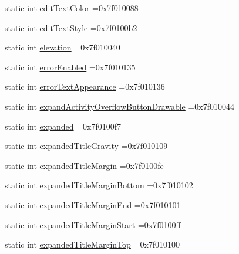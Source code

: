 \begin{DoxyCompactItemize}
\item 
static int \hyperlink{classandroid_1_1support_1_1v7_1_1appcompat_1_1R_1_1attr_ae11656aa9c64037231331f234774b280}{edit\+Text\+Color} =0x7f010088
\item 
static int \hyperlink{classandroid_1_1support_1_1v7_1_1appcompat_1_1R_1_1attr_a74d4dc05fa3ea797344808fee27b9ee2}{edit\+Text\+Style} =0x7f0100b2
\item 
static int \hyperlink{classandroid_1_1support_1_1v7_1_1appcompat_1_1R_1_1attr_a4ad8a7d23ae4731f5836683e9cb7f790}{elevation} =0x7f010040
\item 
static int \hyperlink{classandroid_1_1support_1_1v7_1_1appcompat_1_1R_1_1attr_a6b82c15fbb66c136709becccec25f526}{error\+Enabled} =0x7f010135
\item 
static int \hyperlink{classandroid_1_1support_1_1v7_1_1appcompat_1_1R_1_1attr_a3eeafb095dc2fd2d478b56b33313af0b}{error\+Text\+Appearance} =0x7f010136
\item 
static int \hyperlink{classandroid_1_1support_1_1v7_1_1appcompat_1_1R_1_1attr_a804ae4660db47a214095c80b7b7a5735}{expand\+Activity\+Overflow\+Button\+Drawable} =0x7f010044
\item 
static int \hyperlink{classandroid_1_1support_1_1v7_1_1appcompat_1_1R_1_1attr_a7837ae33f7b43370d81f841bd1cb2f95}{expanded} =0x7f0100f7
\item 
static int \hyperlink{classandroid_1_1support_1_1v7_1_1appcompat_1_1R_1_1attr_a08627166561727866e3653cd31edcaed}{expanded\+Title\+Gravity} =0x7f010109
\item 
static int \hyperlink{classandroid_1_1support_1_1v7_1_1appcompat_1_1R_1_1attr_a7b201fb107f130eb06fe70e6910942ca}{expanded\+Title\+Margin} =0x7f0100fe
\item 
static int \hyperlink{classandroid_1_1support_1_1v7_1_1appcompat_1_1R_1_1attr_a27c921b6ba56656c0f68d92fd8d73095}{expanded\+Title\+Margin\+Bottom} =0x7f010102
\item 
static int \hyperlink{classandroid_1_1support_1_1v7_1_1appcompat_1_1R_1_1attr_a50689e9cb989e5597e509e70eb5f04e4}{expanded\+Title\+Margin\+End} =0x7f010101
\item 
static int \hyperlink{classandroid_1_1support_1_1v7_1_1appcompat_1_1R_1_1attr_a2d39a2245400f68ecb7cd82e84823f57}{expanded\+Title\+Margin\+Start} =0x7f0100ff
\item 
static int \hyperlink{classandroid_1_1support_1_1v7_1_1appcompat_1_1R_1_1attr_a4d409c6027fc796e437be31b11a4cfaf}{expanded\+Title\+Margin\+Top} =0x7f010100
\item 

\end{DoxyCompactItemize}
